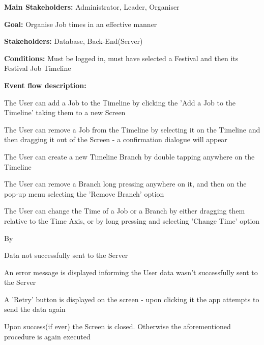 			\noindent {}
			\begin{packed_item}
				\item \textbf{Main Stakeholders:} Administrator, Leader, Organiser
				\item \textbf{Goal:} Organise Job times in an effective manner
				\item \textbf{Stakeholders: } Database, Back-End(Server)
				\item \textbf{Conditions: } Must be logged in, must have selected a Festival and then its Festival Job Timeline
				\item \textbf{Event flow description: }
				\begin{packed_enum}
					\item The User can add a Job to the Timeline by clicking the 'Add a Job to the Timeline' taking them to a new Screen
					\item The User can remove a Job from the Timeline by selecting it on the Timeline and then dragging it out of the Screen - a confirmation dialogue will appear
					\item The User can create a new Timeline Branch by double tapping anywhere on the Timeline
					\item The User can remove a Branch long pressing anywhere on it, and then on the pop-up menu selecting the 'Remove Branch' option
					\item The User can change the Time of a Job or a Branch by either dragging them relative to the Time Axis, or by long pressing and selecting 'Change Time' option
					\item By 
				\end{packed_enum}
				
				\begin{packed_item}
					\item[5.a] Data not successfully sent to the Server
					\item[] \begin{packed_enum}
						\item An error message is displayed informing the User data wasn't successfully sent to the Server
						\item A 'Retry' button is displayed on the screen - upon clicking it the app attempts to send the data again
						\item Upon success(if ever) the Screen is closed. Otherwise the aforementioned procedure is again executed
					\end{packed_enum}
				\end{packed_item}
			\end{packed_item}
			
